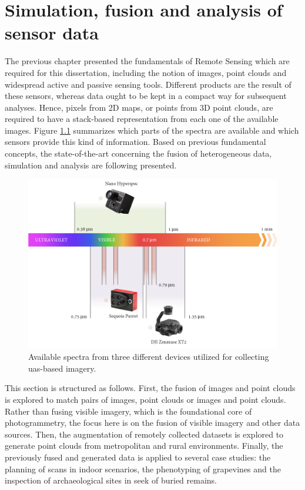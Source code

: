 \chapter{Simulation, fusion and analysis of sensor data}
\label{sec:context_rs}

The previous chapter presented the fundamentals of Remote Sensing which are required for this dissertation, including the notion of images, point clouds and widespread active and passive sensing tools. Different products are the result of these sensors, whereas data ought to be kept in a compact way for subsequent analyses. Hence, pixels from 2D maps, or points from 3D point clouds, are required to have a stack-based representation from each one of the available images. Figure \ref{fig:available_spectra} summarizes which parts of the spectra are available and which sensors provide this kind of information. Based on previous fundamental concepts, the state-of-the-art concerning the fusion of heterogeneous data, simulation and analysis are following presented.

\begin{figure}[ht]
	\includegraphics[width=.9\linewidth]{figs/context/spectra_devices.png}
	\caption{Available spectra from three different devices utilized for collecting \acrshort{uas}-based imagery. }
    \label{fig:available_spectra}
\end{figure}

This section is structured as follows. First, the fusion of images and point clouds is explored to match pairs of images, point clouds or images and point clouds. Rather than fusing visible imagery, which is the foundational core of photogrammetry, the focus here is on the fusion of visible imagery and other data sources. Then, the augmentation of remotely collected datasets is explored to generate point clouds from metropolitan and rural environments. Finally, the previously fused and generated data is applied to several case studies: the planning of scans in indoor scenarios, the phenotyping of grapevines and the inspection of archaeological sites in seek of buried remains.

